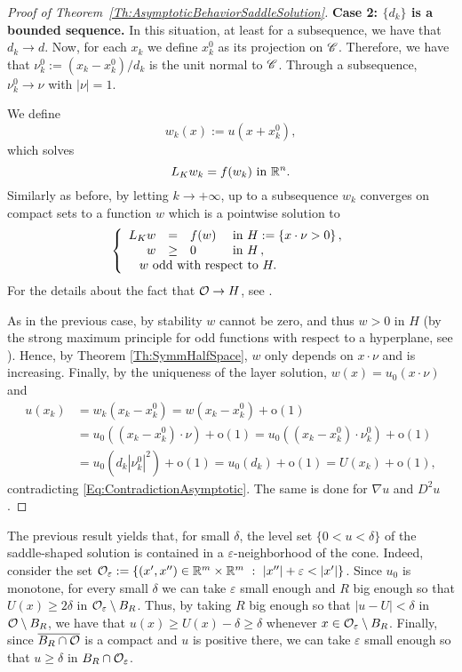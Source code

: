 \begin{proof}[Proof of Theorem~\ref{Th:AsymptoticBehaviorSaddleSolution}]
\textbf{Case 2: $\{d_k\}$ is a bounded sequence.}
In this situation, at least for a subsequence, we have that $d_k \rightarrow d$. Now, for each $x_k$ we define $x_k^0$ as its projection on $\mathscr{C}$. Therefore, we have that $ \nu_k^0 := (x_k-x_k^0)/d_k$ is the unit normal to $\mathscr{C}$. Through a subsequence, $ \nu_k^0 \rightarrow \nu$ with $|\nu|=1$.

We define
$$ w_k (x) := u(x+x_k^0), $$
which solves
$$ L_K  w_k = f(w_k) \ \text{in } \mathbb{R}^n. $$
Similarly as before, by letting $k\to +\infty$, up to a subsequence $w_k$ converges on compact sets to a function $w$ which is a pointwise solution to
$$
\beqc{\PDEsystem}
L_K  w &=& f(w)  &\textrm{ in } H:=\{x\cdot \nu >0\}\,,\\
w &\geq& 0  &\textrm{ in } H\,,\\
\,\,w \text{ odd with respect to } H. \span\span\span \,
\eeqc
$$
For the details about the fact that $\mathcal{O} \rightarrow H$, see \cite{CabreTerraI}.

As in the previous case, by stability $w$ cannot be zero, and thus $w>0$ in $H$ (by the strong maximum principle for odd functions with respect to a hyperplane, see \cite{ChenLiLi}). Hence, by Theorem \ref{Th:SymmHalfSpace}, $w$ only depends on $x\cdot \nu$ and is increasing. Finally, by the uniqueness of the layer solution, $w(x) = u_0(x\cdot \nu)$ and
\begin{align*}
u(x_k) &= w_k(x_k-x_k^0) = w(x_k-x_k^0) + \mathrm{o}(1) \\
&= u_0((x_k-x_k^0)\cdot \nu) + \mathrm{o}(1) = u_0((x_k-x_k^0)\cdot \nu_k^0) + \mathrm{o}(1) \\
&= u_0(d_k |\nu_k^0|^2) + \mathrm{o}(1) = u_0(d_k) + \mathrm{o}(1) = U (x_k) + \mathrm{o}(1),
\end{align*}
contradicting \eqref{Eq:ContradictionAsymptotic}. The same is done for $\nabla u$ and $D^2 u$.
\end{proof}

\begin{remark}
	\label{Remark:u>delta}
	The previous result yields that, for small $\delta$, the level set $\{0<u<\delta\}$ of the saddle-shaped solution is contained in a $\varepsilon$-neighborhood of the cone. Indeed, consider the set $\ocal_\varepsilon := \{(x',x'')\in \R^m\times\R^m \ : \ |x''|+\varepsilon <|x'| \}$. Since $u_0$ is monotone, for every small $\delta$ we can take $\varepsilon$ small enough and $R$ big enough so that $U(x)\geq 2\delta$ in $\mathcal{O}_\varepsilon \setminus B_R$. Thus, by taking $R$ big enough so that $|u-U|< \delta$ in $\mathcal{O} \setminus B_R$, we have that $u(x) \geq U(x)-\delta \geq \delta$ whenever $x\in \mathcal{O}_\varepsilon \setminus B_R$. Finally, since $\overline{B_R \cap \mathcal{O}}$ is a compact and $u$ is positive there, we can take $\varepsilon$ small enough so that $u\geq \delta$ in $B_R\cap \mathcal{O}_\varepsilon$.
\end{remark}